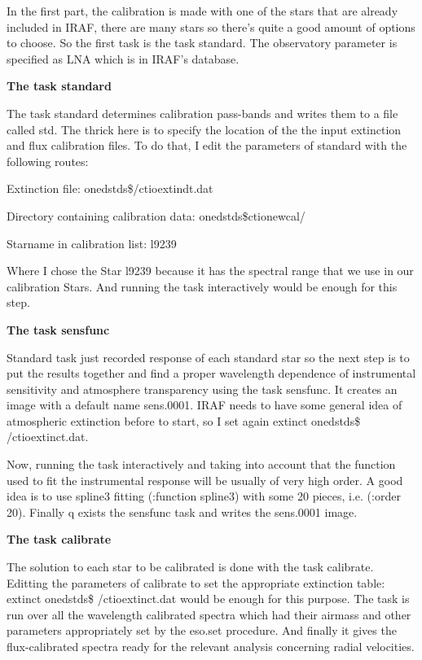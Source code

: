 In the first part, the calibration is made with one of the stars that are already included in IRAF, there are many stars so there's quite a good amount of options to choose. So the first task is the task standard. The observatory parameter is specified as LNA which is in IRAF's database. 

\textbf{The task standard}

The task standard determines calibration pass-bands and writes them to a file called std. The thrick here is to specify the location of the the input extinction and flux calibration files. To do that, I edit the parameters of standard with the following routes:

Extinction file:                              onedstds\$/ctioextindt.dat

Directory containing calibration data:   onedstds\$ctionewcal/

Starname in calibration list:                l9239

Where I chose the Star l9239 because it has the spectral range that we use in our calibration Stars. And running the task interactively would be enough for this step.

\textbf{The task sensfunc}

Standard task just recorded response of each standard star so the next step is to put the results together and find a proper wavelength dependence of instrumental sensitivity and atmosphere transparency using the task sensfunc. It creates an image with a default name sens.0001. IRAF needs to have some general idea of atmospheric extinction before to start, so I set again extinct onedstds\$ /ctioextinct.dat.

Now, running the task interactively and taking into account that the function used to fit the instrumental response will be usually of very high order. A good idea is to use spline3 fitting (:function spline3) with some 20 pieces, i.e. (:order 20).
Finally q exists the sensfunc task and writes the sens.0001 image.

\textbf{The task calibrate}

The solution to each star to be calibrated is done with the task calibrate. Editting the parameters of calibrate to set the appropriate extinction table: extinct onedstds\$ /ctioextinct.dat would be enough for this purpose. The task is run over all the wavelength calibrated spectra which had their airmass and other parameters appropriately set by the eso.set procedure. And finally it gives the flux-calibrated spectra ready for the relevant analysis concerning radial velocities.

